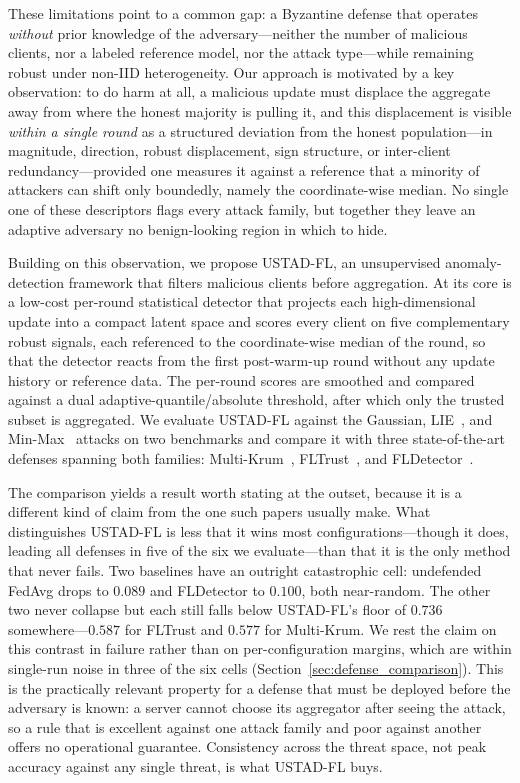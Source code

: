 \documentclass[journal]{IEEEtran}
\begin{document}
These limitations point to a common gap: a Byzantine defense that operates \emph{without} prior knowledge of the adversary---neither the number of malicious clients, nor a labeled reference model, nor the attack type---while remaining robust under non-IID heterogeneity. Our approach is motivated by a key observation: to do harm at all, a malicious update must displace the aggregate away from where the honest majority is pulling it, and this displacement is visible \emph{within a single round} as a structured deviation from the honest population---in magnitude, direction, robust displacement, sign structure, or inter-client redundancy---provided one measures it against a reference that a minority of attackers can shift only boundedly, namely the coordinate-wise median. No single one of these descriptors flags every attack family, but together they leave an adaptive adversary no benign-looking region in which to hide.

Building on this observation, we propose USTAD-FL, an unsupervised anomaly-detection framework that filters malicious clients before aggregation. At its core is a low-cost per-round statistical detector that projects each high-dimensional update into a compact latent space and scores every client on five complementary robust signals, each referenced to the coordinate-wise median of the round, so that the detector reacts from the first post-warm-up round without any update history or reference data. The per-round scores are smoothed and compared against a dual adaptive-quantile/absolute threshold, after which only the trusted subset is aggregated. We evaluate USTAD-FL against the Gaussian, LIE~\cite{baruch2019little}, and Min-Max~\cite{shejwalkar2021manipulating} attacks on two benchmarks and compare it with three state-of-the-art defenses spanning both families: Multi-Krum~\cite{blanchard2017machine}, FLTrust~\cite{cao2020fltrust}, and FLDetector~\cite{zhang2022fldetector}.

The comparison yields a result worth stating at the outset, because it is a different kind of claim from the one such papers usually make. What distinguishes USTAD-FL is less that it wins most configurations---though it does, leading all defenses in five of the six we evaluate---than that it is the only method that never fails. Two baselines have an outright catastrophic cell: undefended FedAvg drops to $0.089$ and FLDetector to $0.100$, both near-random. The other two never collapse but each still falls below USTAD-FL's floor of $0.736$ somewhere---$0.587$ for FLTrust and $0.577$ for Multi-Krum. We rest the claim on this contrast in failure rather than on per-configuration margins, which are within single-run noise in three of the six cells (Section~\ref{sec:defense_comparison}). This is the practically relevant property for a defense that must be deployed before the adversary is known: a server cannot choose its aggregator after seeing the attack, so a rule that is excellent against one attack family and poor against another offers no operational guarantee. Consistency across the threat space, not peak accuracy against any single threat, is what USTAD-FL buys.
\end{document}
